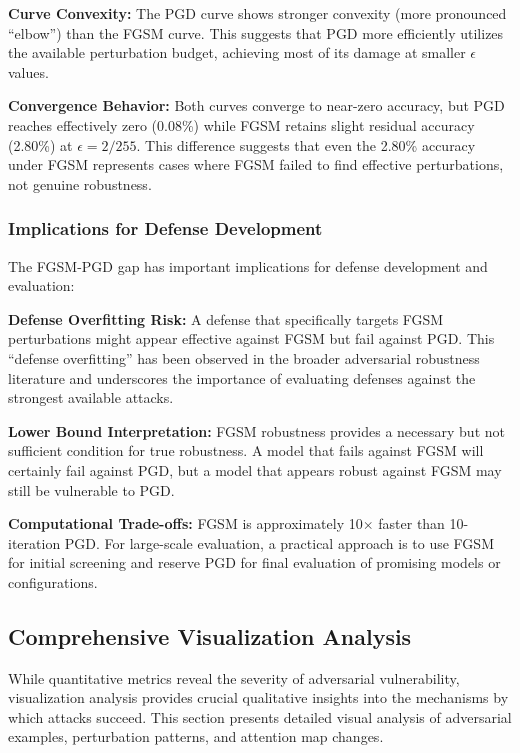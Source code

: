 \documentclass[12pt,a4paper]{article}
\begin{document}
\textbf{Curve Convexity:} The PGD curve shows stronger convexity (more pronounced ``elbow'') than the FGSM curve. This suggests that PGD more efficiently utilizes the available perturbation budget, achieving most of its damage at smaller $\epsilon$ values.

\textbf{Convergence Behavior:} Both curves converge to near-zero accuracy, but PGD reaches effectively zero (0.08\%) while FGSM retains slight residual accuracy (2.80\%) at $\epsilon=2/255$. This difference suggests that even the 2.80\% accuracy under FGSM represents cases where FGSM failed to find effective perturbations, not genuine robustness.

\subsubsection{Implications for Defense Development}

The FGSM-PGD gap has important implications for defense development and evaluation:

\textbf{Defense Overfitting Risk:} A defense that specifically targets FGSM perturbations might appear effective against FGSM but fail against PGD. This ``defense overfitting'' has been observed in the broader adversarial robustness literature and underscores the importance of evaluating defenses against the strongest available attacks.

\textbf{Lower Bound Interpretation:} FGSM robustness provides a necessary but not sufficient condition for true robustness. A model that fails against FGSM will certainly fail against PGD, but a model that appears robust against FGSM may still be vulnerable to PGD.

\textbf{Computational Trade-offs:} FGSM is approximately 10$\times$ faster than 10-iteration PGD. For large-scale evaluation, a practical approach is to use FGSM for initial screening and reserve PGD for final evaluation of promising models or configurations.

\subsection{Comprehensive Visualization Analysis}

While quantitative metrics reveal the severity of adversarial vulnerability, visualization analysis provides crucial qualitative insights into the mechanisms by which attacks succeed. This section presents detailed visual analysis of adversarial examples, perturbation patterns, and attention map changes.
\end{document}
